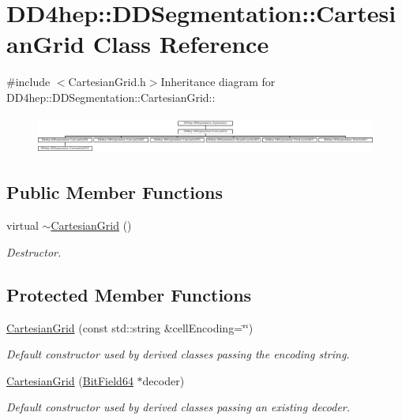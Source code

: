 \hypertarget{class_d_d4hep_1_1_d_d_segmentation_1_1_cartesian_grid}{
\section{DD4hep::DDSegmentation::CartesianGrid Class Reference}
\label{class_d_d4hep_1_1_d_d_segmentation_1_1_cartesian_grid}
}


{\ttfamily \#include $<$CartesianGrid.h$>$}Inheritance diagram for DD4hep::DDSegmentation::CartesianGrid::\begin{figure}[H]
\begin{center}
\leavevmode
\includegraphics[height=1.26984cm]{class_d_d4hep_1_1_d_d_segmentation_1_1_cartesian_grid}
\end{center}
\end{figure}
\subsection*{Public Member Functions}
\begin{DoxyCompactItemize}
\item 
virtual \hyperlink{class_d_d4hep_1_1_d_d_segmentation_1_1_cartesian_grid_a47e47796738c185cae95da0beb464913}{$\sim$CartesianGrid} ()
\begin{DoxyCompactList}\small\item\em Destructor. \item\end{DoxyCompactList}\end{DoxyCompactItemize}
\subsection*{Protected Member Functions}
\begin{DoxyCompactItemize}
\item 
\hyperlink{class_d_d4hep_1_1_d_d_segmentation_1_1_cartesian_grid_a12123b75c013fb62deb0877d923ba1e7}{CartesianGrid} (const std::string \&cellEncoding=\char`\"{}\char`\"{})
\begin{DoxyCompactList}\small\item\em Default constructor used by derived classes passing the encoding string. \item\end{DoxyCompactList}\item 
\hyperlink{class_d_d4hep_1_1_d_d_segmentation_1_1_cartesian_grid_a5a6b4d64466513cabaaf38060b640be8}{CartesianGrid} (\hyperlink{class_d_d4hep_1_1_d_d_segmentation_1_1_bit_field64}{BitField64} $\ast$decoder)
\begin{DoxyCompactList}\small\item\em Default constructor used by derived classes passing an existing decoder. \item\end{DoxyCompactList}\end{DoxyCompactItemize}


